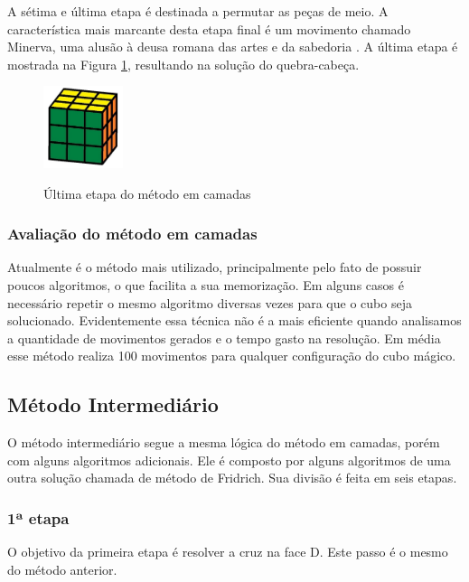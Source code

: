A sétima e última etapa é destinada a permutar as peças de meio. A característica mais marcante desta etapa final é um movimento chamado Minerva, uma alusão à deusa romana das artes e da sabedoria \cite{ana}. A última etapa é mostrada na Figura \ref{fig:figpasso7}, resultando na solução do quebra-cabeça.

\begin{figure}[!htb]
    \centering
    {
        \includegraphics[height=2.4cm]{imagens/passo7.jpg}
        \label{figFront}
    }
    
\caption{Última etapa do método em camadas}
\label{fig:figpasso7}
\end{figure}


\subsubsection{Avaliação do método em camadas}

Atualmente é o método mais utilizado, principalmente pelo fato de possuir poucos algoritmos, o que facilita a sua memorização. Em alguns casos é necessário repetir o mesmo algoritmo diversas vezes para que o cubo seja solucionado. Evidentemente essa técnica não é a mais eficiente quando analisamos a quantidade de movimentos gerados e o tempo gasto na resolução. Em média esse método realiza 100 movimentos para qualquer configuração do cubo mágico.



\subsection{Método Intermediário}

O método intermediário segue a mesma lógica do método em camadas, porém com alguns algoritmos adicionais. Ele é composto por alguns algoritmos de uma outra solução chamada de método de Fridrich. Sua divisão é feita em seis etapas.

\subsubsection{1ª etapa}
    O objetivo da primeira etapa é resolver a cruz na face D. Este passo é o mesmo do método anterior.
    
